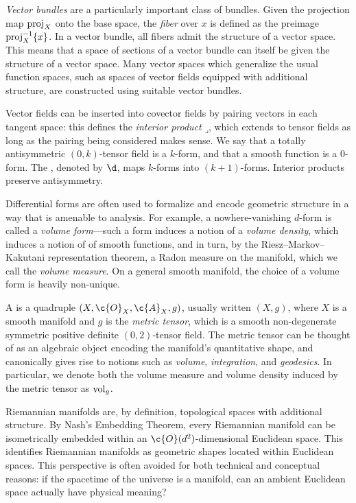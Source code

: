 \documentclass[11pt]{book}
\begin{document}
\emph{Vector bundles} are a particularly important class of bundles.
Given the projection map $\operatorname{proj}_X$ onto the base space, the \emph{fiber} over $x$ is defined as the preimage $\operatorname{proj}_X^{-1} \{x\}$.
In a vector bundle, all fibers admit the structure of a vector space.
This means that a space of sections of a vector bundle can itself be given the structure of a vector space. 
Many vector spaces which generalize the usual function spaces, such as spaces of vector fields equipped with additional structure, are constructed using suitable vector bundles.

Vector fields can be inserted into covector fields by pairing vectors in each tangent space: this defines the \emph{interior product} $\mathbin{\lrcorner}$, which extends to tensor fields as long as the pairing being considered makes sense.
We say that a totally antisymmetric $(0,k)$-tensor field is a $k$-form, and that a smooth function is a $0$-form.
The , denoted by $\d$, maps $k$-forms into $(k+1)$-forms.
Interior products preserve antisymmetry.

Differential forms are often used to formalize and encode geometric structure in a way that is amenable to analysis.
For example, a nowhere-vanishing $d$-form is called a \emph{volume form}---such a form induces a notion of a \emph{volume density}, which induces a notion of  of smooth functions, and in turn, by the Riesz--Markov--Kakutani representation theorem, a Radon measure on the manifold, which we call the \emph{volume measure}.
On a general smooth manifold, the choice of a volume form is heavily non-unique.

A  is a quadruple $(X,\c{O}_X,\c{A}_X,g)$, usually written $(X,g)$, where $X$ is a smooth manifold and $g$ is the \emph{metric tensor}, which is a smooth non-degenerate symmetric positive definite $(0,2)$-tensor field.
The metric tensor can be thought of as an algebraic object encoding the manifold's quantitative shape, and canonically gives rise to notions such as \emph{volume}, \emph{integration}, and \emph{geodesics}.
In particular, we denote both the volume measure and volume density induced by the metric tensor as $\operatorname{vol}_g$.

Riemannian manifolds are, by definition, topological spaces with additional structure.
By Nash's Embedding Theorem, every Riemannian manifold can be isometrically embedded within an $\c{O}(d^2)$-dimensional Euclidean space.
This identifies Riemannian manifolds as geometric shapes located within Euclidean spaces.
This perspective is often avoided for both technical and conceptual reasons: if the spacetime of the universe is a manifold, can an ambient Euclidean space actually have physical meaning?
\end{document}
